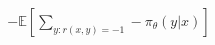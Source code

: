 \documentclass[preview]{standalone}
\begin{document}
\begin{align*}
-\mathbb{E}\left[\sum_{y:r(x,y)=-1}-\pi_\theta(y|x)\right]
\end{align*}
\end{document}
